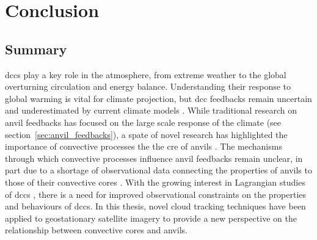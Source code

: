\chapter{Conclusion} \label{chp:conclusion}

\section{Summary}

\acrshort{dcc}s play a key role in the atmosphere, from extreme weather to the global overturning circulation and energy balance.
Understanding their response to global warming is vital for climate projection, but \acrshort{dcc} feedbacks remain uncertain \citep{sherwood_assessment_2020} and underestimated by current climate models \citep{hill_climate_2023}.
While traditional research on anvil feedbacks has focused on the large scale response of the climate (see section~\ref{sec:anvil_feedbacks}), a spate of novel research has highlighted the importance of convective processes the the \acrshort{cre} of anvils \citep{raghuraman_observational_2024, sokol_greater_2024, mckim_weak_2024}.
The mechanisms through which convective processes influence anvil feedbacks remain unclear, in part due to a shortage of observational data connecting the properties of anvils to those of their convective cores \citep{gasparini_opinion_2023}.
With the growing interest in Lagrangian studies of \acrshort{dcc}s \citep{gasparini_what_2019, sokol_tropical_2020, bouniol_life_2021}, there is a need for improved observational constraints on the properties and behaviours of \acrshort{dcc}s.
In this thesis, novel cloud tracking techniques have been applied to geostationary satellite imagery to provide a new perspective on the relationship between convective cores and anvils.




% 


